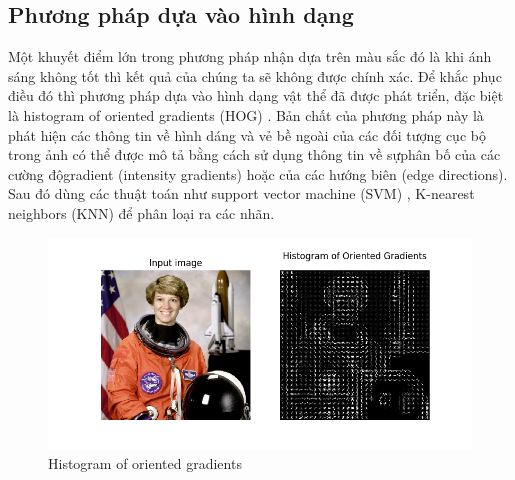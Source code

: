 \subsection{Phương pháp dựa vào hình dạng}
Một khuyết điểm lớn trong phương pháp nhận dựa trên màu sắc đó là khi ánh sáng không tốt thì kết quả của chúng ta sẽ không được chính xác. Để khắc phục điều đó thì phương pháp dựa vào hình dạng vật thể đã được phát triển, đặc biệt là histogram of oriented gradients (HOG) \cite{dalal2005histograms}. Bản chất của phương pháp này là  phát hiện các thông tin về hình dáng và vẻ bề ngoài của các đối tượng cục bộ trong ảnh có thể được mô tả bằng cách sử dụng thông tin về sựphân bố của các cường độgradient (intensity gradients) hoặc của các hướng biên (edge directions). Sau đó dùng các thuật toán như support vector machine (SVM) \cite{mlcb}, K-nearest neighbors (KNN) \cite{mlcb} để phân loại ra các nhãn.
\begin{figure}[H]
\begin{center}
\includegraphics[scale=0.8]{header/image/hog_02.png}
\end{center}
\caption{Histogram of oriented gradients}
\end{figure}
